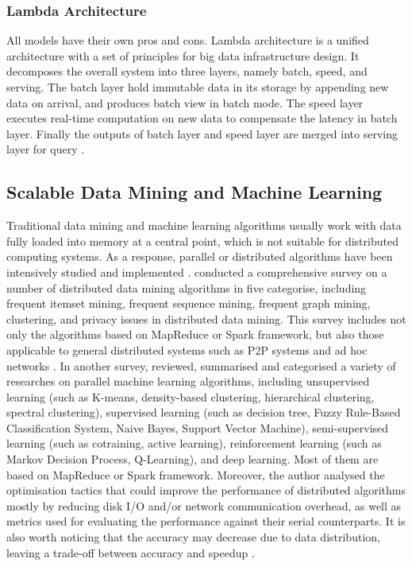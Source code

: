 \documentclass[conference]{IEEEtran}
\begin{document}
\hypertarget{lambda-architecture}{%
\subsubsection{Lambda Architecture}\label{lambda-architecture}}

All models have their own pros and cons. Lambda architecture is a
unified architecture with a set of principles for big data
infrastructure design. It decomposes the overall system into three
layers, namely batch, speed, and serving. The batch layer hold immutable
data in its storage by appending new data on arrival, and produces batch
view in batch mode. The speed layer executes real-time computation on
new data to compensate the latency in batch layer. Finally the outputs
of batch layer and speed layer are merged into serving layer for query
\autocite{Gupta2016}.

\hypertarget{scalable-data-mining-and-machine-learning}{%
\subsection{Scalable Data Mining and Machine
Learning}\label{scalable-data-mining-and-machine-learning}}

Traditional data mining and machine learning algorithms usually work
with data fully loaded into memory at a central point, which is not
suitable for distributed computing systems. As a response, parallel or
distributed algorithms have been intensively studied and implemented
\autocite{gan2017,Gupta2016}. \textcite{gan2017} conducted a
comprehensive survey on a number of distributed data mining algorithms
in five categorise, including frequent itemset mining, frequent sequence
mining, frequent graph mining, clustering, and privacy issues in
distributed data mining. This survey includes not only the algorithms
based on MapReduce or Spark framework, but also those applicable to
general distributed systems such as P2P systems and ad hoc networks
\autocite{gan2017}. In another survey, \textcite{Gupta2016} reviewed,
summarised and categorised a variety of researches on parallel machine
learning algorithms, including unsupervised learning (such as K-means,
density-based clustering, hierarchical clustering, spectral clustering),
supervised learning (such as decision tree, Fuzzy Rule-Based
Classification System, Naive Bayes, Support Vector Machine),
semi-supervised learning (such as cotraining, active learning),
reinforcement learning (such as Markov Decision Process, Q-Learning),
and deep learning. Most of them are based on MapReduce or Spark
framework. Moreover, the author analysed the optimisation tactics that
could improve the performance of distributed algorithms mostly by
reducing disk I/O and/or network communication overhead, as well as
metrics used for evaluating the performance against their serial
counterparts. It is also worth noticing that the accuracy may decrease
due to data distribution, leaving a trade-off between accuracy and
speedup \autocite{Gupta2016}.
\end{document}
